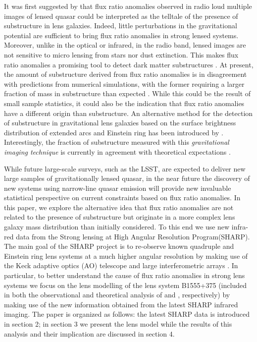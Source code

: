 \documentclass[useAMS,usenatbib]{mn2e}
\begin{document}
It was first suggested by \citet{Mao1998} that flux ratio anomalies observed in radio loud multiple images of lensed quasar could be interpreted as the telltale of the presence of substructure in lens galaxies.
Indeed, little perturbations in the gravitational potential are sufficient to bring flux ratio anomalies in strong lensed systems. 
Moreover, unlike in the optical or infrared, in the radio band, lensed images are not sensitive to micro lensing from stars nor dust extinction. 
This makes flux ratio anomalies a promising tool to detect dark matter substructures \citep{Dalal2002, N13}.  
At present, the amount of substructure derived from flux ratio anomalies is in disagreement with predictions from numerical simulations, with the former requiring a larger fraction of mass in substructure than expected \citet{Xu14}. While this could be the result of small sample statistics, it could also be the indication that flux ratio anomalies have a different origin than substructure. An alternative method for the detection of substructure in gravitational lens galaxies based on the surface brightness distribution of extended arcs and Einstein ring has been introduced by \citet{K05,V09}. Interestingly, the fraction of substructure measured with this \emph{gravitational imaging technique} is currently in agreement with theoretical expectations \citep{V14a}.

While future large-scale surveys, such as the LSST, are
  expected to deliver new large samples of gravitationally lensed
  quasar, in the near future the discovery of new systems using
narrow-line quasar emission \citep{N14} will provide new
  invaluable statistical perspective on current constraints based on
  flux ratio anomalies.  In this paper, we explore the alternative
  idea that flux ratio anomalies are not related to the presence of
  substructure but originate in a more complex lens galaxy mass
  distribution than initially considered. To this end we use new
  infra-red data from the Strong lensing at High Angular Resolution
  Program(SHARP). The main goal of the SHARP project is to
  re-observe known quadruple and Einstein ring lens systems at a much
higher angular resolution by making use of the Keck adaptive optics
(AO) telescope and large interferometric arrays \citep{SHARP12,V12}
. In particular, to better understand the cause of flux ratio
anomalies in strong lens systems we focus on the lens
  modelling of the lens system B1555+375 (included in both the
  observational and theoretical analysis of \citet{Dalal2002} and
  \citet{Xu14}, respectively) by making use of the new information
obtained from the latest SHARP infrared imaging. The paper is
  organized as follows: the latest SHARP data is introduced in section
  2; in section 3 we present the lens model while the results of this
  analysis and their implication are discussed in section 4.
\end{document}
